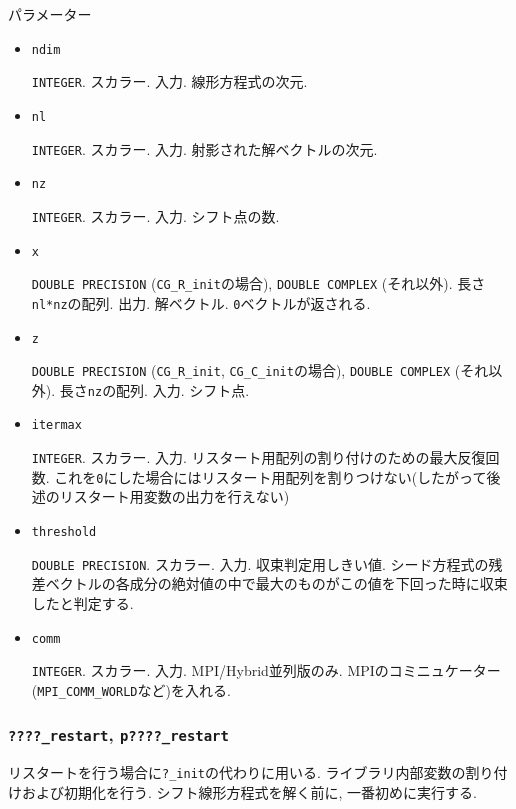 \documentclass[12pt,titlepage]{jarticle}
\begin{document}
\noindent パラメーター

\begin{itemize}

\item \verb|ndim|

  \verb|INTEGER|. スカラー. 入力. 線形方程式の次元.

\item \verb|nl|

  \verb|INTEGER|. スカラー. 入力. 射影された解ベクトルの次元.

\item \verb|nz|

  \verb|INTEGER|. スカラー. 入力. シフト点の数.

\item \verb|x|

  \verb|DOUBLE PRECISION| (\verb|CG_R_init|の場合),
  \verb|DOUBLE COMPLEX| (それ以外).
  長さ \verb|nl*nz|の配列. 出力.
  解ベクトル. \verb|0|ベクトルが返される.

\item \verb|z|

  \verb|DOUBLE PRECISION| (\verb|CG_R_init|, \verb|CG_C_init|の場合),
  \verb|DOUBLE COMPLEX| (それ以外).
  長さ\verb|nz|の配列. 入力. シフト点.

\item \verb|itermax|

  \verb|INTEGER|. スカラー. 入力. リスタート用配列の割り付けのための最大反復回数.
  これを\verb|0|にした場合にはリスタート用配列を割りつけない(したがって後述のリスタート用変数の出力を行えない)

\item \verb|threshold|

  \verb|DOUBLE PRECISION|. スカラー. 入力. 収束判定用しきい値.
  シード方程式の残差ベクトルの各成分の絶対値の中で最大のものがこの値を下回った時に収束したと判定する.

\item \verb|comm|

  \verb|INTEGER|. スカラー. 入力. MPI/Hybrid並列版のみ.
  MPIのコミニュケーター(\verb|MPI_COMM_WORLD|など)を入れる.

\end{itemize}

\subsubsection{\texttt{????\_restart}, \texttt{p????\_restart}}

  リスタートを行う場合に\verb|?_init|の代わりに用いる.
  ライブラリ内部変数の割り付けおよび初期化を行う.
  シフト線形方程式を解く前に, 一番初めに実行する.
\end{document}

